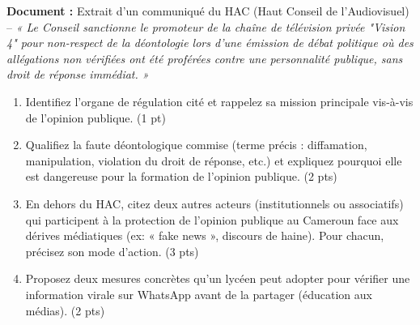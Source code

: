 \documentclass[11pt]{article}
\begin{document}
\begin{exercice}
\textbf{Document :} Extrait d'un communiqué du HAC (Haut Conseil de l'Audiovisuel) -- \textit{« Le Conseil sanctionne le promoteur de la chaîne de télévision privée "Vision 4" pour non-respect de la déontologie lors d'une émission de débat politique où des allégations non vérifiées ont été proférées contre une personnalité publique, sans droit de réponse immédiat. »}

\begin{enumerate}
    \item Identifiez l'organe de régulation cité et rappelez sa mission principale vis-à-vis de l'opinion publique. (1 pt)
    \item Qualifiez la faute déontologique commise (terme précis : diffamation, manipulation, violation du droit de réponse, etc.) et expliquez pourquoi elle est dangereuse pour la formation de l'opinion publique. (2 pts)
    \item En dehors du HAC, citez deux autres acteurs (institutionnels ou associatifs) qui participent à la protection de l'opinion publique au Cameroun face aux dérives médiatiques (ex: « fake news », discours de haine). Pour chacun, précisez son mode d'action. (3 pts)
    \item Proposez deux mesures concrètes qu'un lycéen peut adopter pour vérifier une information virale sur WhatsApp avant de la partager (éducation aux médias). (2 pts)
\end{enumerate}
\end{exercice}
\end{document}

